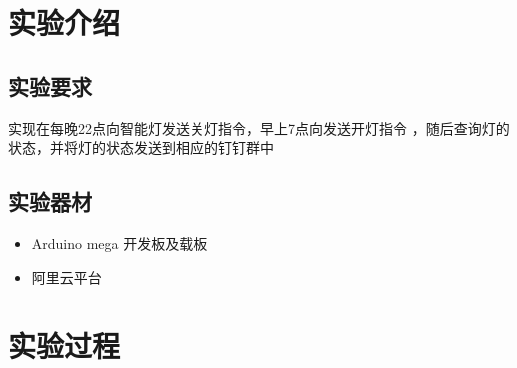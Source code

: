 \documentclass[12pt,hyperref,a4paper,UTF8]{ctexart}
\begin{document}
\cover

%
%

\thispagestyle{empty} %

\newpage
\tableofcontents

\newpage


\section{实验介绍}
\subsection{实验要求}

实现在每晚22点向智能灯发送关灯指令，早上7点向发送开灯指令 ，随后查询灯的状态，并将灯的状态发送到相应的钉钉群中
\subsection{实验器材}
\begin{itemize}[itemsep=-5pt, topsep=0pt, partopsep=0pt]
    \item Arduino mega 开发板及载板
    \item 阿里云平台
\end{itemize}


\section{实验过程}
\end{document}

